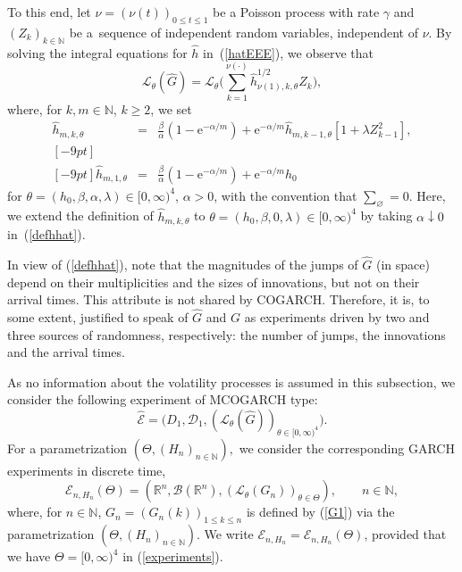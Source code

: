 \documentclass[number,citesort,seceqn,dvips]{arxbj}
\newcommand{\eqref}[1]{(\ref{#1})}
\newcommand{\RR}{\mathbb{R}}
\newcommand{\NN}{\mathbb{N}}
\newcommand{\BBB}{{\mathcal B}}
\newcommand{\DDD}{{\mathcal D}}
\newcommand{\EEE}{{\mathcal E}}
\newcommand{\LLL}{{\mathcal L}}
\begin{document}
To this end, let $\nu=(\nu(t))_{0\le t\le1}$ be a Poisson process with
rate $\gamma$ and $(Z_k)_{k\in\NN}$ be a~sequence of independent random
variables, independent of $\nu$. By solving the integral equations for
$\hat h$ in~\eqref{hatEEE}, we observe that
%
\begin{equation}\label{defhatG}
\LLL_\theta(\widehat
G) = \LLL_{\theta} \Biggl(\sum_{k=1}^{\nu(\cdot)} \hat
h^{1/2}_{\nu(1),k,\theta} Z_k \Biggr)  ,
\end{equation}
%
where, for
$k,m\in\NN$, $k\ge2$, we set
%
\begin{eqnarray}\label{defhhat}
\hat
h_{m,k,\theta}&=&\frac{\beta}{\alpha}  (1 - \mathrm{e}^{-\alpha
/m} )+\mathrm{e}^{-\alpha/m}\hat h_{m,k-1,\theta} [1+\lambda Z_{k-1}^2] ,\nonumber\\ [-9pt]\\ [-9pt]
\hat h_{m,1,\theta}&=&\frac{\beta}{\alpha}  (1 - \mathrm{e}^{-\alpha
/m} )+\mathrm{e}^{-\alpha/m}h_0\nonumber
\end{eqnarray}
%
for $\theta=(h_0,\beta,\alpha,\lambda)\in[0,\infty)^4$, $\alpha>0$,
with the convention that $\sum_\varnothing=0$. Here, we extend the
definition of $\hat h_{m,k,\theta}$ to
$\theta=(h_0,\beta,0,\lambda)\in[0,\infty)^4$ by taking
$\alpha\downarrow0$ in~\eqref{defhhat}.

In view of \eqref{defhhat}, note that the magnitudes of the jumps of
$\widehat G$ (in space) depend on their multiplicities and the sizes of
innovations, but not on their arrival times. This attribute is not
shared by COGARCH. Therefore, it is, to some extent, justified to
speak of $\widehat G$ and $G$ as experiments driven by two and three
sources of randomness, respectively: the number of jumps, the
innovations and the arrival times.\vadjust{\goodbreak}

As no information about the volatility processes is assumed in this
subsection, we consider the following experiment of MCOGARCH type:
%
\begin{equation}\label{MCOGARCH}
\widehat\EEE =  \bigl(D_1,\DDD_1, (\LLL_{\theta}(\widehat
G) )_{\theta\in[0,\infty)^4} \bigr) .
\end{equation}
%
For a parametrization $(\Theta,(H_n)_{n\in\NN}),$ we consider the
corresponding GARCH experiments in discrete time,
%
\begin{equation}\label{experiments}
\EEE_{n,H_n}(\Theta) =  (\RR^n,\BBB(\RR^n), (\LLL
_{\theta}(G_n) )_{\theta\in\Theta}),\qquad
n\in\NN ,
\end{equation}
%
where, for $n\in\NN$, $G_n=(G_n(k))_{1\le k\le n}$ is defined by
\eqref{G1} via the parametrization $(\Theta,(H_n)_{n\in\NN})$. We write
$\EEE_{n,H_n}=\EEE_{n,H_n}(\Theta)$, provided that we have
$\Theta=[0,\infty)^4$ in \eqref{experiments}.
\end{document}
